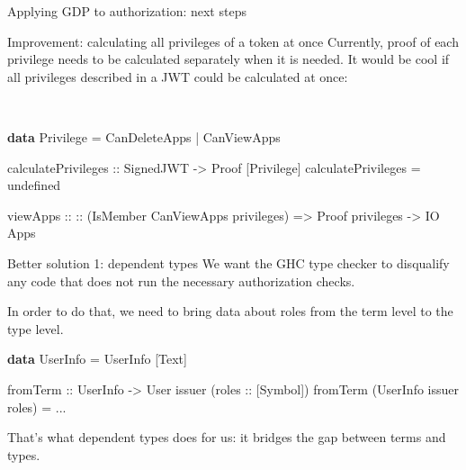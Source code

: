 \documentclass[
  9pt,
  ignorenonframetext,
]{beamer}
\newenvironment{Shaded}{}{}
\newcommand{\DataTypeTok}[1]{\textcolor[rgb]{0.56,0.13,0.00}{#1}}
\newcommand{\FunctionTok}[1]{\textcolor[rgb]{0.02,0.16,0.49}{#1}}
\newcommand{\KeywordTok}[1]{\textcolor[rgb]{0.00,0.44,0.13}{\textbf{#1}}}
\newcommand{\NormalTok}[1]{#1}
\newcommand{\OperatorTok}[1]{\textcolor[rgb]{0.40,0.40,0.40}{#1}}
\newcommand{\OtherTok}[1]{\textcolor[rgb]{0.00,0.44,0.13}{#1}}
\begin{document}
\begin{frame}[fragile]{Applying GDP to authorization: next steps}
\protect\hypertarget{applying-gdp-to-authorization-next-steps-1}{}
\begin{block}{Improvement: calculating all privileges of a token at
once}
\protect\hypertarget{improvement-calculating-all-privileges-of-a-token-at-once}{}
Currently, proof of each privilege needs to be calculated separately
when it is needed. It would be cool if all privileges described in a JWT
could be calculated at once:\\
\strut \\

\begin{Shaded}
\begin{Highlighting}[]
\KeywordTok{data} \DataTypeTok{Privilege} \OtherTok{=} \DataTypeTok{CanDeleteApps} \OperatorTok{|} \DataTypeTok{CanViewApps}

\OtherTok{calculatePrivileges ::} \DataTypeTok{SignedJWT} \OtherTok{{-}\textgreater{}} \DataTypeTok{Proof}\NormalTok{ [}\DataTypeTok{Privilege}\NormalTok{]}
\NormalTok{calculatePrivileges }\OtherTok{=} \FunctionTok{undefined}

\OtherTok{viewApps ::}
\OtherTok{  ::}\NormalTok{ (}\DataTypeTok{IsMember} \DataTypeTok{CanViewApps}\NormalTok{ privileges)}
  \OtherTok{=\textgreater{}} \DataTypeTok{Proof}\NormalTok{ privileges }
  \OtherTok{{-}\textgreater{}} \DataTypeTok{IO} \DataTypeTok{Apps}
\end{Highlighting}
\end{Shaded}
\end{block}




\end{frame}

\begin{frame}[fragile]{Better solution 1: dependent types}
\protect\hypertarget{better-solution-1-dependent-types}{}
We want the GHC type checker to disqualify any code that does not run
the necessary authorization checks.

In order to do that, we need to bring data about roles from the term
level to the type level.

\begin{Shaded}
\begin{Highlighting}[]
\KeywordTok{data} \DataTypeTok{UserInfo} \OtherTok{=} \DataTypeTok{UserInfo}\NormalTok{ [}\DataTypeTok{Text}\NormalTok{]}

\NormalTok{fromTerm }
\OtherTok{  ::} \DataTypeTok{UserInfo} \OtherTok{{-}\textgreater{}} \DataTypeTok{User}\NormalTok{ issuer (}\OtherTok{roles ::}\NormalTok{ [}\DataTypeTok{Symbol}\NormalTok{])}
\NormalTok{fromTerm (}\DataTypeTok{UserInfo}\NormalTok{ issuer roles) }\OtherTok{=} \OperatorTok{...}
\end{Highlighting}
\end{Shaded}

That's what dependent types does for us: it bridges the gap between
terms and types.
\end{frame}
\end{document}
